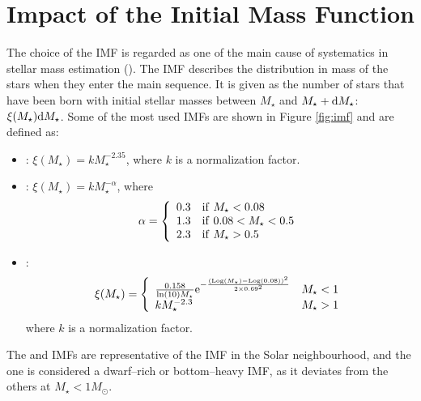 {\section{Impact of the Initial Mass Function}\label{sec:imf}
The choice of the IMF is regarded as one of the main cause of systematics in stellar mass estimation (\citealt{coupon}). The IMF describes the distribution in mass of the stars when they enter the main sequence. It is given as the number of stars that have been born with initial stellar masses between $M_\star$ and $M_\star+{\rm d} M_\star$: $\xi(M_\star) {\rm d} M_\star$. Some of the most used IMFs are shown in Figure \ref{fig:imf} and are defined as:
\begin{itemize}
\item \citet{salpeter}: $\xi(M_\star)=k M_\star^{-2.35}$, where $k$ is a normalization factor.
\item \citet{kroupa}: $\xi(M_\star) = k M_\star^{-\alpha}$, where \begin{equation}
\alpha = \left\{ \begin{array}{ll}   0.3 & {\rm if} ~M_\star < 0.08\\
1.3 & {\rm if} ~0.08<M_\star < 0.5\\
2.3 & {\rm if} ~M_\star >0.5\\
\end{array}
\right.
\end{equation}
\item \citet{chabrier}:
\begin{equation}
\xi(M_\star)= \left\{ \begin{array}{ll}   \frac{0.158}{{\rm ln}(10)M_\star} {\rm e}^{-\frac{({\rm Log}(M_\star) - {\rm Log}(0.08))^2}{2\times 0.69^2}} & M_\star < 1\\
kM_\star^{-2.3} & M_\star > 1
\end{array}
\right.
\end{equation}
where $k$ is a normalization factor.
\end{itemize}
The \citet{kroupa} and \citet{chabrier} IMFs are representative of the IMF in the Solar neighbourhood, and the \citet{salpeter} one is considered a dwarf--rich or bottom--heavy IMF, as it deviates from the others at $M_\star<1 M_\odot$.

}
